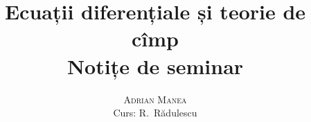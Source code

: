 \documentclass[12pt, a4paper]{book}
\begin{document}
\thispagestyle{empty}
\pagestyle{plain} %

\title{\huge\textbf{Ecuații diferențiale și teorie de cîmp} \\ \Large{Notițe de seminar}}
\vspace{1cm}
\author{\Large\textsc{Adrian Manea} \\ \large{Curs: R.\ Rădulescu}}

\maketitle

\tableofcontents

\setcounter{page}{1} %










\renewcommand{\indexname}{Index}
\printindex
\end{document}
